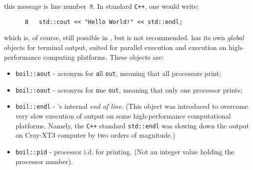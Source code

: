 this message is line number~8. In standard {\tt C++}, one would write:
%
{\small \begin{verbatim}
      8   std::cout << "Hello World!" << std::endl;
\end{verbatim}}
%
which is, of course, still possible in {\psiboil}, but is not recommended.
{\psiboil} has its own {\em global} objects for terminal output, suited
for parallel execution and execution on high-performance computing platforms. 
These objects are:
%
\begin{itemize}
  \item {\tt boil::aout} - acronym for {\tt a}ll {\tt out}, meaning that all 
                           processors print;
  \item {\tt boil::oout} - acronym for {\tt o}ne {\tt out}, meaning that only 
                           one processor prints;
  \item {\tt boil::endl} - {\psiboil}'s internal {\em end of line}. (This 
                           object was introduced to overcome very slow execution
                           of output on some high-performance computational platforms.
                           Namely, the {\tt C++} standard {\tt std::endl} was slowing
                           down the output on Cray-XT3 computer by two orders of 
                           magnitude.) 
  \item {\tt boil::pid} - processor i.d. for printing. (Not an integer value holding
                          the processor number). 
\end{itemize}
%

